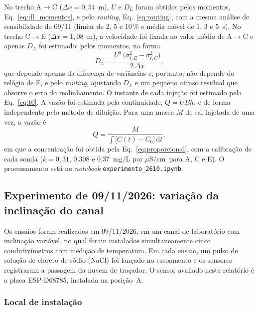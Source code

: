 \documentclass[12pt,a4paper]{article}
\providecommand{\uScm}{\ensuremath{\mu}S/cm}
\begin{document}
No trecho A$\rightarrow$C ($\Delta x = 0{,}54$~m), $U$ e $D_L$ foram obtidos pelos momentos, Eq.~\eqref{eq:dl_momentos}, e pelo \emph{routing}, Eq.~\eqref{eq:routing}, com a mesma análise de sensibilidade de 09/11 (limiar de 2, 5 e 10\,\% e média móvel de 1, 3 e 5~s). No trecho C$\rightarrow$E ($\Delta x = 1{,}08$~m), a velocidade foi fixada no valor médio de A$\rightarrow$C e apenas $D_L$ foi estimado: pelos momentos, na forma
\begin{equation}
  D_L = \frac{U^{3}\,\bigl(\sigma_{t,E}^{2} - \sigma_{t,C}^{2}\bigr)}{2\,\Delta x},
  \label{eq:dl_var_2610}
\end{equation}
que depende apenas da diferença de variâncias e, portanto, não depende do relógio de E, e pelo \emph{routing}, ajustando $D_L$ e um pequeno atraso residual que absorve o erro do realinhamento. O instante de cada injeção foi estimado pela Eq.~\eqref{eq:t0}. A vazão foi estimada pela continuidade, $Q = U B h$, e de forma independente pelo método de diluição. Para uma massa $M$ de sal injetada de uma vez, a vazão é
\begin{equation}
  Q = \frac{M}{\displaystyle\int \bigl[C(t) - C_0\bigr]\,\mathrm{d}t},
  \label{eq:diluicao}
\end{equation}
em que a concentração foi obtida pela Eq.~\eqref{eq:proporcional}, com a calibração de cada sonda ($k = 0{,}31$, 0,308 e 0,37~mg/L por \uScm\ para A, C e E). O processamento está no \emph{notebook} \texttt{experimento\_\allowbreak 2610.ipynb}.

\subsection{Experimento de 09/11/2026: variação da inclinação do canal}
\label{sec:met_exp0911}

Os ensaios foram realizados em 09/11/2026, em um canal de laboratório com inclinação variável, no qual foram instalados simultaneamente cinco condutivímetros com medição de temperatura. Em cada ensaio, um pulso de solução de cloreto de sódio (NaCl) foi lançado no escoamento e os sensores registraram a passagem da nuvem de traçador. O sensor avaliado neste relatório é a placa ESP-D68785, instalada na posição~A.

\subsubsection{Local de instalação}
\label{sec:local}
\end{document}

